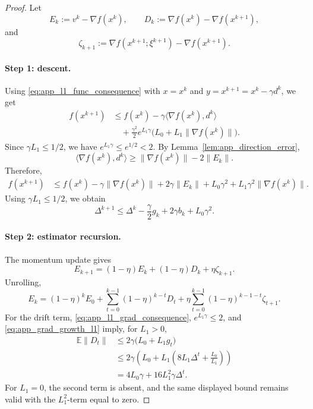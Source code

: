 \documentclass[10pt,a4paper]{amsart}
\newcommand{\E}{\mathbb{E}}
\begin{document}
\begin{proof}
Let
\[
    E_k:=v^k-\nabla f(x^k),
    \qquad
    D_k:=\nabla f(x^k)-\nabla f(x^{k+1}),
\]
and
\[
    \zeta_{k+1}
    :=
    \nabla f(x^{k+1};\xi^{k+1})-\nabla f(x^{k+1}).
\]

\paragraph{Step 1: descent.}
Using \eqref{eq:app_l1_func_consequence} with
\(x=x^k\) and \(y=x^{k+1}=x^k-\gamma d^k\), we get
\[
\begin{aligned}
    f(x^{k+1})
    &\le
    f(x^k)-\gamma\langle\nabla f(x^k),d^k\rangle \\
    &\quad
    +\frac{\gamma^2}{2}e^{L_1\gamma}
    \bigl(L_0+L_1\|\nabla f(x^k)\|\bigr).
\end{aligned}
\]
Since \(\gamma L_1\le 1/2\), we have \(e^{L_1\gamma}\le e^{1/2}<2\).
By Lemma~\ref{lem:app_direction_error},
\[
    \langle\nabla f(x^k),d^k\rangle
    \ge
    \|\nabla f(x^k)\|-2\|E_k\|.
\]
Therefore,
\[
\begin{aligned}
    f(x^{k+1})
    &\le
    f(x^k)
    -\gamma\|\nabla f(x^k)\|
    +2\gamma\|E_k\|
    +L_0\gamma^2
    +L_1\gamma^2\|\nabla f(x^k)\|.
\end{aligned}
\]
Using \(\gamma L_1\le1/2\), we obtain
\begin{equation}
\label{eq:app_l1_descent_recursion}
    \Delta^{k+1}
    \le
    \Delta^k-\frac{\gamma}{2}g_k+2\gamma b_k+L_0\gamma^2.
\end{equation}

\paragraph{Step 2: estimator recursion.}
The momentum update gives
\[
    E_{k+1}
    =
    (1-\eta)E_k+(1-\eta)D_k+\eta\zeta_{k+1}.
\]
Unrolling,
\[
    E_k
    =
    (1-\eta)^kE_0
    +\sum_{t=0}^{k-1}(1-\eta)^{k-t}D_t
    +\eta\sum_{t=0}^{k-1}(1-\eta)^{k-1-t}\zeta_{t+1}.
\]
For the drift term, \eqref{eq:app_l1_grad_consequence},
\(e^{L_1\gamma}\le2\), and \eqref{eq:app_grad_growth_l1} imply, for
\(L_1>0\),
\[
\begin{aligned}
    \E\|D_t\|
    &\le
    2\gamma\bigl(L_0+L_1g_t\bigr) \\
    &\le
    2\gamma\left(L_0+L_1
    \left(8L_1\Delta^t+\frac{L_0}{L_1}\right)\right) \\
    &=
    4L_0\gamma+16L_1^2\gamma\Delta^t.
\end{aligned}
\]
For \(L_1=0\), the second term is absent, and the same displayed bound remains
valid with the \(L_1^2\)-term equal to zero.


\end{proof}
\end{document}

